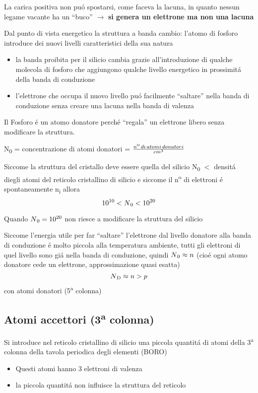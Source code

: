 La carica positiva non pu\'o spostarsi, come faceva la lacuna, in quanto nessun legame vacante ha un ``buco'' $\rightarrow$ \textbf{si genera un elettrone ma non una lacuna}

Dal punto di vista energetico la struttura a banda cambio:
l'atomo di fosforo introduce dei nuovi livelli caratteristici della sua natura
\begin{itemize}
    \item la banda proibita per il silicio cambia grazie all'introduzione di qualche molecola di fosforo che aggiungono qualche livello energetico in prossimit\'a della banda di conduzione
    \item l'elettrone che occupa il nuovo livello pu\'o facilmente ``saltare'' nella banda di conduzione senza creare una lacuna nella banda di valenza

\end{itemize}

Il Fosforo \'e un atomo donatore perch\'e ``regala'' un elettrone libero senza modificare la struttura.

N\textsubscript{0} = concentrazione di atomi donatori = $\frac{n\textsuperscript{o}\,di\,atomi\, donatori}{cm^3}$

Siccome la struttura del cristallo deve essere quella del silicio N\textsubscript{0} $<$ densit\'a diegli atomi del reticolo cristallino di silicio e siccome il n\textsuperscript{o} di elettroni \'e spontaneamente n\textsubscript{i} allora
\[
    10^{10} < N\textsubscript{0} < 10^{20}
\]

Quando $N\textsubscript{0}=10^{20}$ non riesce a modificare la struttura del silicio

Siccome l'energia utile per far ``saltare'' l'elettrone dal livello donatore alla banda di conduzione \'e molto piccola alla temperatura ambiente, tutti gli elettroni di quel livello sono gi\'a nella banda di conduzione, quindi $N\textsubscript{0} \approx n$  (cio\'e ogni atomo donatore cede un elettrone, approssimazione quasi esatta)
\[
    N\textsubscript{D} \approx n > p
\] con atomi donatori (5\textsuperscript{a} colonna)

\subsection{Atomi accettori (3\textsuperscript{a} colonna)}
Si introduce nel reticolo cristallino di silicio una piccola quantit\'a di atomi della 3\textsuperscript{a} colonna della tavola periodica degli elementi (BORO)
\begin{itemize}
    \item Questi atomi hanno 3 elettroni di valenza
    \item la piccola quantit\'a non influisce la struttura del reticolo
\end{itemize}

